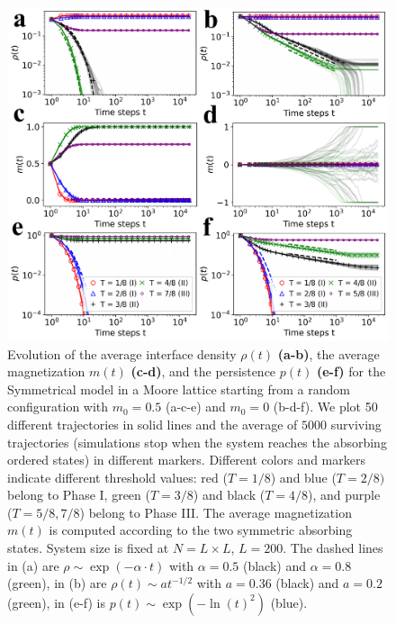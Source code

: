 \begin{figure}
		\centering \captionsetup{font=sf}
		\includegraphics[width=\linewidth]{Figs/Aging_STM/FIG10.pdf}
		\caption[Dynamical regimes in a Moore lattice.]{\label{fig:evolution_lattice} Evolution of the average interface density $\rho(t)$ \textbf{(a-b)}, the average magnetization $m(t)$ \textbf{(c-d)}, and the persistence $p(t)$ \textbf{(e-f)} for the Symmetrical model in a Moore lattice starting from a random configuration with $m_0 = 0.5$ (a-c-e) and $m_0 = 0$ (b-d-f). We plot 50 different trajectories in solid lines and the average of $5000$ surviving trajectories (simulations stop when the system reaches the absorbing ordered states) in different markers. Different colors and markers indicate different threshold values: red ($T = 1/8$) and blue ($T = 2/8)$ belong to Phase I, green ($T = 3/8$) and black ($T=4/8$), and purple ($T = 5/8, 7/8$) belong to Phase III. The average magnetization $m(t)$ is computed according to the two symmetric absorbing states. System size is fixed at $N = L \times L$, $L = 200$. The dashed lines in (a) are $\rho \sim \exp(-\alpha \cdot t)$ with $\alpha = 0.5$ (black) and $\alpha = 0.8$ (green), in (b) are $\rho(t) \sim at^{-1/2}$ with $a = 0.36$ (black) and $a = 0.2$ (green), in (e-f) is $p(t) \sim \exp(- \ln(t)^2)$ (blue).
		}
\end{figure}

